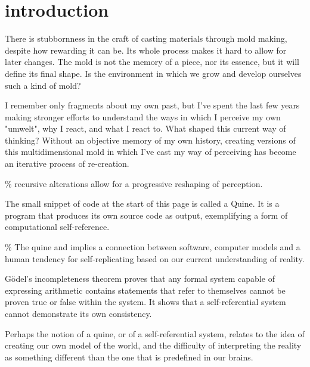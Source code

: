 \chapter*{introduction}
\begin{center}
\vspace{2cm}
\begin{flushright}
\footnotesize 

\end{flushright}
\vspace{2cm}
\end{center}
\normalsize

There is stubbornness in the craft of casting materials through mold making, despite how rewarding it can be. Its whole process makes it hard to allow for later changes. The mold is not the memory of a piece, nor its essence, but it will define its final shape. Is the environment in which we grow and develop ourselves such a kind of mold? 

I remember only fragments about my own past, but I’ve spent the last few years making stronger efforts to understand the ways in which I perceive my own "umwelt", why I react, and what I react to.  What shaped this current way of thinking? Without an objective memory of my own history, creating versions of this multidimensional mold in which I’ve cast my way of perceiving has become an iterative process of re-creation.

{\scriptsize \textcolor{comment}{\% recursive alterations allow for a progressive reshaping of perception. }}

The small snippet of code at the start of this page is called a Quine. It is a program that produces its own source code as output, exemplifying a form of computational self-reference. 

{\scriptsize \textcolor{comment}{\% The quine and implies a connection between software, computer models and a human tendency for self-replicating based on our current understanding of reality.}}

Gödel’s incompleteness theorem proves that any formal system capable of expressing arithmetic contains statements that refer to themselves cannot be proven true or false within the system. It shows that a self-referential system cannot demonstrate its own consistency.

Perhaps the notion of a quine, or of a self-referential system, relates to the idea of creating our own model of the world, and the difficulty of interpreting the reality as something different than the one that is predefined in our brains. 


